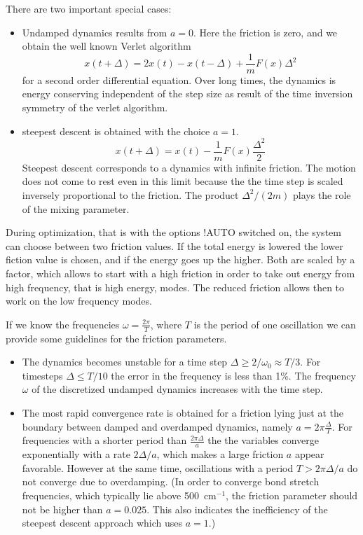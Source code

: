 \documentclass[final,12pt]{article}
\begin{document}
{{{{{{There are two important special cases:
\begin{itemize}
\item Undamped dynamics results from $a=0$. Here the friction is zero,
and we obtain the well known Verlet algorithm
\begin{displaymath}
x(t+\Delta)=2x(t)-x(t-\Delta)+\frac{1}{m}F(x)\Delta^2
\end{displaymath}
  for a second order differential equation. Over long times, the
  dynamics is energy conserving independent of the step size as result
  of the time inversion symmetry of the verlet algorithm.
\item steepest descent is obtained with the choice $a=1$.
   \begin{displaymath}
    x(t+\Delta)=x(t)-\frac{1}{m}F(x)\frac{\Delta^2}{2}
    \end{displaymath}
      Steepest descent corresponds to a dynamics with infinite
      friction.  The motion does not come to rest even in this limit
      because the the time step is scaled inversely proportional to
      the friction. The product $\Delta^2/(2m)$ plays the role of the
      mixing parameter.
\end{itemize}


During optimization, that is with the options !AUTO switched on, the
system can choose between two friction values. If the total energy is
lowered the lower fiction value is chosen, and if the energy goes up
the higher. Both are scaled by a factor, which allows to start with a
high friction in order to take out energy from high frequency, that is
high energy, modes. The reduced friction allows then to work on the
low frequency modes.


If we know the frequencies $\omega=\frac{2\pi}{T}$, where $T$ is the
period of one oscillation we can provide some guidelines for the
friction parameters.
\begin{itemize}
\item The dynamics becomes unstable for a time step $\Delta\ge
    2/\omega_0\approx T/3$. For timesteps $\Delta\le T/10$ the error
    in the frequency is less than 1\%.  The frequency $\omega$ of the
    discretized undamped dynamics increases with the time step.
\item The most rapid convergence rate is obtained for a friction
    lying just at the boundary between damped and overdamped dynamics,
    namely $a=2\pi\frac{\Delta}{T}$. For frequencies with a shorter
    period than $\frac{2\pi\Delta}{a}$ the the variables converge
    exponentially with a rate $2\Delta/a$, which makes a large
    friction $a$ appear favorable.  However at the same time,
    oscillations with a period $T>2\pi\Delta/a$ do not converge due to
    overdamping. (In order to converge bond stretch frequencies, which
    typically lie above 500~cm$^{-1}$, the friction parameter should
    not be higher than $a=0.025$. This also indicates the inefficiency
    of the steepest descent approach which uses $a=1$.)
\end{itemize}

}}}}}}
\end{document}

